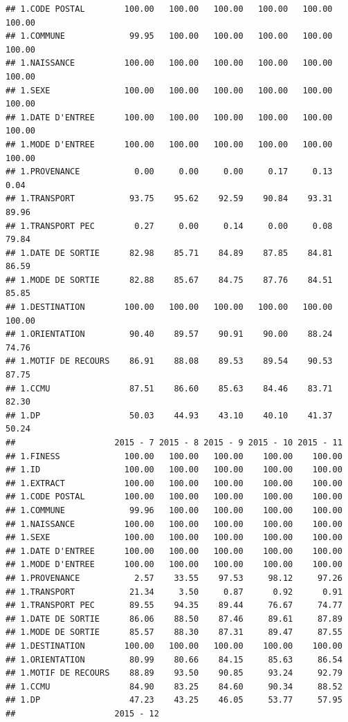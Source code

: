\documentclass[]{article}
\begin{document}
\begin{verbatim}
## 1.CODE POSTAL        100.00   100.00   100.00   100.00   100.00   100.00
## 1.COMMUNE             99.95   100.00   100.00   100.00   100.00   100.00
## 1.NAISSANCE          100.00   100.00   100.00   100.00   100.00   100.00
## 1.SEXE               100.00   100.00   100.00   100.00   100.00   100.00
## 1.DATE D'ENTREE      100.00   100.00   100.00   100.00   100.00   100.00
## 1.MODE D'ENTREE      100.00   100.00   100.00   100.00   100.00   100.00
## 1.PROVENANCE           0.00     0.00     0.00     0.17     0.13     0.04
## 1.TRANSPORT           93.75    95.62    92.59    90.84    93.31    89.96
## 1.TRANSPORT PEC        0.27     0.00     0.14     0.00     0.08    79.84
## 1.DATE DE SORTIE      82.98    85.71    84.89    87.85    84.81    86.59
## 1.MODE DE SORTIE      82.88    85.67    84.75    87.76    84.51    85.85
## 1.DESTINATION        100.00   100.00   100.00   100.00   100.00   100.00
## 1.ORIENTATION         90.40    89.57    90.91    90.00    88.24    74.76
## 1.MOTIF DE RECOURS    86.91    88.08    89.53    89.54    90.53    87.75
## 1.CCMU                87.51    86.60    85.63    84.46    83.71    82.30
## 1.DP                  50.03    44.93    43.10    40.10    41.37    50.24
##                    2015 - 7 2015 - 8 2015 - 9 2015 - 10 2015 - 11
## 1.FINESS             100.00   100.00   100.00    100.00    100.00
## 1.ID                 100.00   100.00   100.00    100.00    100.00
## 1.EXTRACT            100.00   100.00   100.00    100.00    100.00
## 1.CODE POSTAL        100.00   100.00   100.00    100.00    100.00
## 1.COMMUNE             99.96   100.00   100.00    100.00    100.00
## 1.NAISSANCE          100.00   100.00   100.00    100.00    100.00
## 1.SEXE               100.00   100.00   100.00    100.00    100.00
## 1.DATE D'ENTREE      100.00   100.00   100.00    100.00    100.00
## 1.MODE D'ENTREE      100.00   100.00   100.00    100.00    100.00
## 1.PROVENANCE           2.57    33.55    97.53     98.12     97.26
## 1.TRANSPORT           21.34     3.50     0.87      0.92      0.91
## 1.TRANSPORT PEC       89.55    94.35    89.44     76.67     74.77
## 1.DATE DE SORTIE      86.06    88.50    87.46     89.61     87.89
## 1.MODE DE SORTIE      85.57    88.30    87.31     89.47     87.55
## 1.DESTINATION        100.00   100.00   100.00    100.00    100.00
## 1.ORIENTATION         80.99    80.66    84.15     85.63     86.54
## 1.MOTIF DE RECOURS    88.89    93.50    90.85     93.24     92.79
## 1.CCMU                84.90    83.25    84.60     90.34     88.52
## 1.DP                  47.23    43.25    46.05     53.77     57.95
##                    2015 - 12

\end{verbatim}
\end{document}
